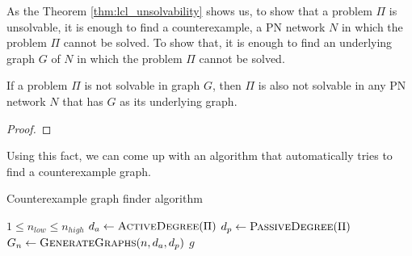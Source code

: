 As the Theorem \ref{thm:lcl_unsolvability} shows us, to show that a problem $\Pi$ is unsolvable, it is enough to find a counterexample, a PN network $N$ in which the problem $\Pi$ cannot be solved.
To show that, it is enough to find an underlying graph $G$ of $N$ in which the problem $\Pi$ cannot be solved.
\begin{theorem} \label{thm:problem_unsolvability_in_graphs}
    If a problem $\Pi$ is not solvable in graph $G$, then $\Pi$ is also not solvable in any PN network $N$ that has $G$ as its underlying graph.
\end{theorem}
\begin{proof}
\end{proof}

Using this fact, we can come up with an algorithm that automatically tries to find a counterexample graph.

\begin{algorithm}[H]
    \caption{Counterexample graph finder algorithm}
    \label{alg:counterexample_finder}
    \begin{algorithmic}[1] %
        \Require $1 \leq n_{low} \leq n_{high}$
          \label{alg:counterexample_finder:n_loop}
            \State $d_a \gets \textsc{ActiveDegree}(\Pi)$ \label{alg:counterexample_finder:d_a}
            \State $d_p \gets \textsc{PassiveDegree}(\Pi)$ \label{alg:counterexample_finder:d_p}
              \label{alg:counterexample_finder:n}
                \State $G_n \gets \textsc{GenerateGraphs}(n, d_a, d_p)$ \label{alg:counterexample_finder:Gn}
                 \label{alg:counterexample_finder:g}
                     \label{alg:counterexample_finder:is_unsolvable}
                        \State \Return $g$ \label{alg:counterexample_finder:return_g}
                    \EndIf
                \EndFor
            \EndFor
            \State \Return {} \label{alg:counterexample_finder:return_nothing}
        \EndFunction
    \end{algorithmic}
\end{algorithm}

